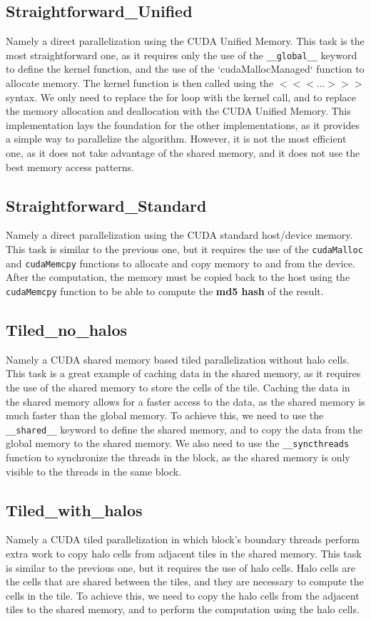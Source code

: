 \documentclass{article}
\begin{document}
\subsection{Straightforward\_Unified}
Namely a direct parallelization using the CUDA Unified Memory.
This task is the most straightforward one, as it requires only the use of the \texttt{\_\_global\_\_} keyword to define the kernel function, and the use of the `cudaMallocManaged` function to allocate memory. The kernel function is then called using the $<<<...>>>$ syntax. We only need to replace the for loop with the kernel call, and to replace the memory allocation and deallocation with the CUDA Unified Memory.
This implementation lays the foundation for the other implementations, as it provides a simple way to parallelize the algorithm. However, it is not the most efficient one, as it does not take advantage of the shared memory, and it does not use the best memory access patterns.

\subsection{Straightforward\_Standard}
Namely a direct parallelization using the CUDA standard host/device memory.
This task is similar to the previous one, but it requires the use of the \texttt{cudaMalloc} and \texttt{cudaMemcpy} functions to allocate and copy memory to and from the device. After the computation, the memory must be copied back to the host using the \texttt{cudaMemcpy} function to be able to compute the \textbf{md5 hash} of the result.

\subsection{Tiled\_no\_halos}
Namely a CUDA shared memory based tiled parallelization without halo cells.
This task is a great example of caching data in the shared memory, as it requires the use of the shared memory to store the cells of the tile. Caching the data in the shared memory allows for a faster access to the data, as the shared memory is much faster than the global memory. To achieve this, we need to use the \texttt{\_\_shared\_\_} keyword to define the shared memory, and to copy the data from the global memory to the shared memory. We also need to use the \texttt{\_\_syncthreads} function to synchronize the threads in the block, as the shared memory is only visible to the threads in the same block.

\subsection{Tiled\_with\_halos}
Namely a CUDA tiled parallelization in which block’s boundary threads perform extra work to copy halo cells from adjacent tiles in the shared memory.
This task is similar to the previous one, but it requires the use of halo cells. Halo cells are the cells that are shared between the tiles, and they are necessary to compute the cells in the tile. To achieve this, we need to copy the halo cells from the adjacent tiles to the shared memory, and to perform the computation using the halo cells.
\end{document}
